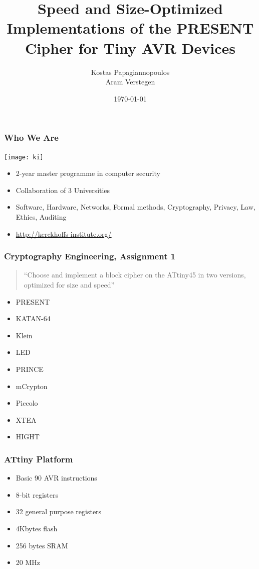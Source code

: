 \documentclass{beamer}
\title[Speed and Size-Optimized PRESENT for AVR]{Speed and Size-Optimized Implementations of the PRESENT Cipher for Tiny AVR Devices}
\author[Papagiannopoulos and Verstegen]{
Kostas Papagiannopoulos \\
Aram Verstegen
}
\date{\today}
\begin{document}
\frame{\titlepage}

\begin{frame}[fragile]
\frametitle{Who We Are}
\texttt{[image: ki]}
\begin{itemize}
\item 2-year master programme in computer security
\item Collaboration of 3 Universities
\item Software, Hardware, Networks, Formal methods, Cryptography, Privacy, Law, Ethics, Auditing
\item \url{http://kerckhoffs-institute.org/}
\end{itemize}
\end{frame}

\begin{frame}[fragile]
\frametitle{Cryptography Engineering, Assignment 1}
\begin{quote}
``Choose and implement a block cipher on the ATtiny45 in two versions, optimized for size and speed''
\end{quote}

\begin{itemize}
\item PRESENT
\item KATAN-64
\item Klein
\item LED
\item PRINCE
\item mCrypton
\item Piccolo
\item XTEA
\item HIGHT
\end{itemize}
\end{frame}

\begin{frame}[fragile]
\frametitle{ATtiny Platform}
\begin{itemize}
\item Basic 90 AVR instructions
\item 8-bit registers
\item 32 general purpose registers
\item 4Kbytes flash
\item 256 bytes SRAM
\item 20 MHz
\end{itemize}
\end{frame}
\end{document}

